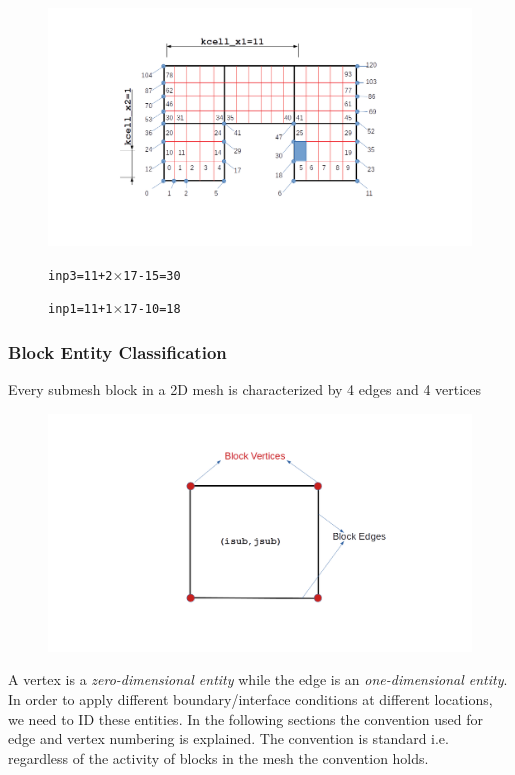 \documentclass[a4paper,12pt]{article}
\begin{document}
\begin{figure}[H]
	\centering
	\includegraphics[trim=140 120 200 75,clip,scale=0.4]{figures/InactiveMeshNodeIDCalc-Eg2.png}	
	\caption{\texttt{inp1=11+1$\times$17-10=18}}{\texttt{inp3=11+2$\times$17-15=30}}
\end{figure}

\subsubsection{Block Entity Classification}
Every submesh block in a 2D mesh is characterized by 4 edges and 4 vertices
\begin{figure}[H]
	\centering
	\includegraphics[trim=140 120 200 75,clip,scale=0.35]{figures/Block-Classification.png}
\end{figure}
A vertex is a \textit{zero-dimensional entity} while the edge is an \textit{one-dimensional entity}. In order to apply different boundary/interface conditions at different locations, we need to ID these entities. In the following sections the convention used for edge and vertex numbering is explained. The convention is standard i.e. regardless of the activity of blocks in the mesh the convention holds. 
\end{document}

